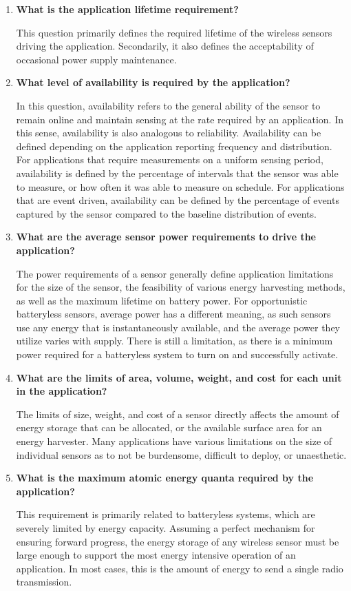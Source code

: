 \begin{enumerate}
    \item \textbf{What is the application lifetime requirement?}
    
    This question primarily defines the required lifetime of the wireless sensors driving the application. Secondarily, it also defines the acceptability of occasional power supply maintenance. 
    
    \item \textbf{What level of availability is required by the application?}
    
    In this question, availability refers to the general ability of the sensor to remain online and maintain sensing at the rate required by an application. In this sense, availability is also analogous to reliability. 
    Availability can be defined depending on the application reporting frequency and distribution. For applications that require measurements on a uniform sensing period, availability is defined by the percentage of intervals that the sensor was able to measure, or how often it was able to measure on schedule. For applications that are event driven, availability can be defined by the percentage of events captured by the sensor compared to the baseline distribution of events. 
    
    \item \textbf{What are the average sensor power requirements to drive the application?}
    
    The power requirements of a sensor generally define application limitations for the size of the sensor, the feasibility of various energy harvesting methods, as well as the maximum lifetime on battery power.
    For opportunistic batteryless sensors, average power has a different meaning, as such sensors use any energy that is instantaneously available, and the average power they utilize varies with supply. 
    There is still a limitation, as there is a minimum power required for a batteryless system to turn on and successfully activate. 
    
    \item \textbf{What are the limits of area, volume, weight, and cost for each unit in the application?}
    
    The limits of size, weight, and cost of a sensor directly affects the amount of energy storage that can be allocated, or the available surface area for an energy harvester. Many applications have various limitations on the size of individual sensors as to not be burdensome, difficult to deploy, or unaesthetic.
    
    \item \textbf{What is the maximum atomic energy quanta required by the application?}
    
    This requirement is primarily related to batteryless systems, which are severely limited by energy capacity. Assuming a perfect mechanism for ensuring forward progress, the energy storage of any wireless sensor must be large enough to support the most energy intensive operation of an application. In most cases, this is the amount of energy to send a single radio transmission.
    
\end{enumerate}

